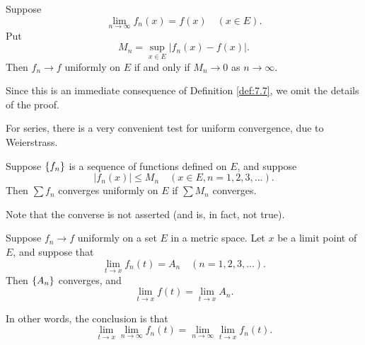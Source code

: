 \begin{thm}
    \label{thm:7.9}
    Suppose 
    \begin{equation*}
        \lim_{n \to \infty} f_n (x) = f(x)
        \quad 
        (x \in E).
    \end{equation*}
    Put 
    \begin{equation*}
        M_n = \sup_{x \in E} \left| f_n (x) - f(x) \right| .
    \end{equation*}
    Then $f_n \rightarrow f$ uniformly on $E$ if and only if $M_n \rightarrow 0$ as $n \rightarrow \infty$.
\end{thm}

Since this is an immediate consequence of Definition \ref{def:7.7}, 
we omit the details of the proof.

For series, there is a very convenient test for uniform convergence, due to
Weierstrass.

\begin{thm}
    \label{thm:7.10}
    Suppose $\protect\{f_n\}$ is a sequence of functions defined on $E$, 
    and suppose
    \begin{equation*}
        \left| f_n (x) \right| \leq M_n
        \quad 
        (x \in E, n = 1, 2, 3, ... ).
    \end{equation*}
    Then $\sum f_n$ converges uniformly on $E$ if $\sum M_n$ converges.
\end{thm}

Note that the converse is not asserted (and is, in fact, not true).

\begin{thm}
    \label{thm:7.11}
    Suppose $f_n \rightarrow f$ uniformly on a set $E$ in a metric space. 
    Let $x$ be a limit point of $E$, and suppose that
    \begin{equation}
        \label{eq:7.15}
        \lim_{t \to x} f_n (t) = A_n
        \quad
        (n = 1, 2, 3, ... ).
    \end{equation}
    Then $\protect\{A_n\}$ converges, and
    \begin{equation}
        \label{eq:7.16}
        \lim_{t \to x} f(t) = \lim_{t \to x} A_n.
    \end{equation}

    In other words, the conclusion is that
    \begin{equation}
        \label{eq:7.17}
        \lim_{t \to x} \lim_{n \to \infty} f_n (t) = 
        \lim_{n \to \infty} \lim_{t \to x} f_n (t).
    \end{equation}
\end{thm}

